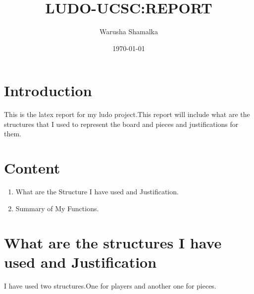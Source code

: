 \documentclass[a4paper,12pt]{article}
\title{LUDO-UCSC:REPORT}
\author{Warusha Shamalka}
\date{\today}
\begin{document}
\maketitle
\section{Introduction}
	This is the latex report for my ludo project.This report will include what are the structures that I used to represent the board and pieces and justifications for them.
\section{Content}

\begin{enumerate}
	\item What are the Structure I have used and Justification.
	\item Summary of My Functions.
\end{enumerate}
\section{What are the structures I have used and Justification}

I have used two structures.One for players and another one for pieces.
\end{document}
